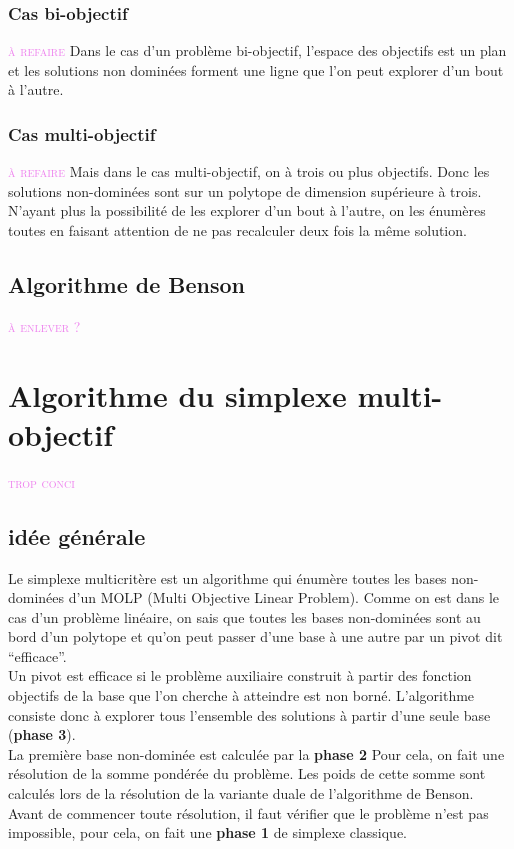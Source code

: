 \documentclass[a4paper,10pt]{article}
\newcommand{\arthur}[1]{\textcolor{violet}{\textsc{#1}}}
\theoremstyle{plain}
\begin{document}
\subsubsection{Cas bi-objectif}\arthur{à refaire}
Dans le cas d'un problème bi-objectif, l'espace des objectifs est un plan et les solutions non dominées forment une ligne que l'on peut explorer d'un bout à l'autre.

\subsubsection{Cas multi-objectif}\arthur{à refaire}
Mais dans le cas multi-objectif, on à trois ou plus objectifs. Donc les solutions non-dominées sont sur un polytope de dimension supérieure à trois. N'ayant plus la possibilité de les explorer d'un bout à l'autre, on les énumères toutes en faisant attention de ne pas recalculer deux fois la même solution.

\subsection{Algorithme de Benson}\arthur{à enlever ?}

\section{Algorithme du simplexe multi-objectif}\arthur{trop conci}

\subsection{idée générale}

Le simplexe multicritère est un algorithme qui énumère toutes les bases non-dominées d'un MOLP (Multi Objective Linear Problem).
Comme on est dans le cas d'un problème linéaire, on sais que toutes les bases non-dominées sont au bord d'un polytope et qu'on peut passer d'une base à une autre par un pivot dit ``efficace''.\\
Un pivot est efficace si le problème auxiliaire construit à partir des fonction objectifs de la base que l'on cherche à atteindre est non borné. L'algorithme consiste donc à explorer tous l'ensemble des solutions à partir d'une seule base (\textbf{phase 3}).\\
La première base non-dominée est calculée par la \textbf{phase 2} Pour cela, on fait une résolution de la somme pondérée du problème. Les poids de cette somme sont calculés lors de la résolution de la variante duale de l'algorithme de Benson.\\
Avant de commencer toute résolution, il faut vérifier que le problème n'est pas impossible, pour cela, on fait une \textbf{phase 1} de simplexe classique.
\end{document}
